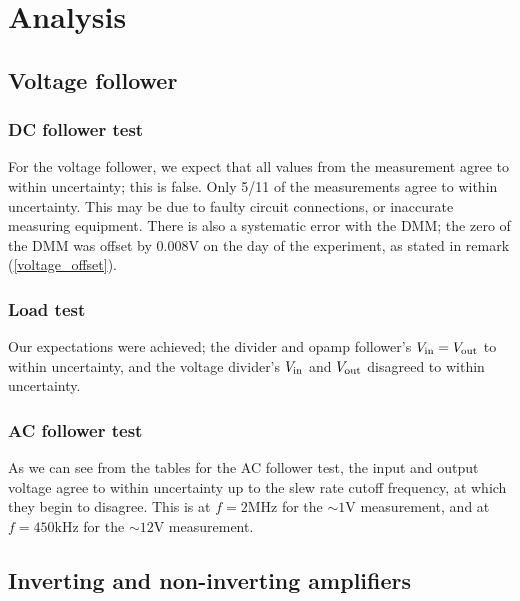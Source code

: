 \documentclass[11pt]{article}
\begin{document}
\newpage
\section{Analysis}

\subsection{Voltage follower}


\subsubsection{DC follower test}
For the voltage follower, we expect that all values 
from the measurement agree to within uncertainty; this is false. 
Only 5/11 of the measurements agree to within uncertainty. 
This may be due to faulty circuit connections, or inaccurate measuring 
equipment. There is also a systematic error with the DMM; the zero of 
the DMM was offset by $0.008\si{\volt}$ on the day of the experiment, 
as stated in remark (\ref{voltage_offset}).

\subsubsection{Load test}
Our expectations were
achieved; the divider and opamp follower's 
$V_{\rm in} = V_{\rm out}$ to within uncertainty, and the
voltage divider's $V_{\rm in}$ and $V_{\rm out}$ disagreed to within
uncertainty.


\subsubsection{AC follower test}
As we can see from the tables for the AC follower test,
the input and output voltage agree to within uncertainty
up to the slew rate cutoff frequency, at which they begin
to disagree. This is at $f = 2\si{\mega\hertz}$ for the $\sim 1\si{\volt}$
measurement, and at $f = 450\si{\kilo\hertz}$ for the $\sim 12\si{\volt}$ 
measurement. 

\subsection{Inverting and non-inverting amplifiers}
\end{document}
